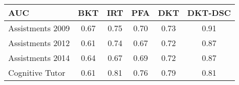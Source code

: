 \begin{tabular}[]{lccccc}
\toprule
AUC & BKT & IRT & PFA & DKT & DKT-DSC
\tabularnewline
\midrule
Assistments 2009 & 0.67 & 0.75 & 0.70 & 0.73 & \alert{0.91}\tabularnewline
Assistments 2012 & 0.61 & 0.74 & 0.67 & 0.72 & \alert{0.87}\tabularnewline
Assistments 2014 & 0.64 & 0.67 & 0.69 & 0.72 & \alert{0.87}\tabularnewline
Cognitive Tutor & 0.61 & \alert{0.81} & 0.76 & 0.79 & \alert{0.81}\tabularnewline
\bottomrule
\end{tabular}
